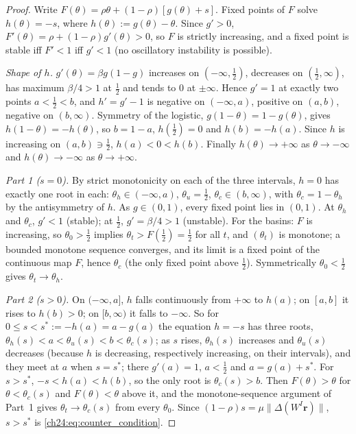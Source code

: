 \documentclass[../structural_economics_book.tex]{subfiles}
\begin{document}
\begin{proof}
Write $F(\theta) = \rho\theta + (1-\rho)[g(\theta) + s]$. Fixed points of $F$ solve $h(\theta) = -s$, where $h(\theta) := g(\theta) - \theta$. Since $g' > 0$, $F'(\theta) = \rho + (1-\rho)g'(\theta) > 0$, so $F$ is strictly increasing, and a fixed point is stable iff $F' < 1$ iff $g' < 1$ (no oscillatory instability is possible).

\emph{Shape of $h$.} $g'(\theta) = \beta g(1-g)$ increases on $(-\infty,\tfrac12)$, decreases on $(\tfrac12,\infty)$, has maximum $\beta/4 > 1$ at $\tfrac12$ and tends to $0$ at $\pm\infty$. Hence $g' = 1$ at exactly two points $a < \tfrac12 < b$, and $h' = g' - 1$ is negative on $(-\infty,a)$, positive on $(a,b)$, negative on $(b,\infty)$. Symmetry of the logistic, $g(1-\theta) = 1 - g(\theta)$, gives $h(1-\theta) = -h(\theta)$, so $b = 1-a$, $h(\tfrac12) = 0$ and $h(b) = -h(a)$. Since $h$ is increasing on $(a,b) \ni \tfrac12$, $h(a) < 0 < h(b)$. Finally $h(\theta) \to +\infty$ as $\theta \to -\infty$ and $h(\theta) \to -\infty$ as $\theta \to +\infty$.

\emph{Part 1 ($s=0$).} By strict monotonicity on each of the three intervals, $h = 0$ has exactly one root in each: $\theta_h \in (-\infty, a)$, $\theta_u = \tfrac12$, $\theta_c \in (b, \infty)$, with $\theta_c = 1 - \theta_h$ by the antisymmetry of $h$. As $g \in (0,1)$, every fixed point lies in $(0,1)$. At $\theta_h$ and $\theta_c$, $g' < 1$ (stable); at $\tfrac12$, $g' = \beta/4 > 1$ (unstable). For the basins: $F$ is increasing, so $\theta_0 > \tfrac12$ implies $\theta_t > F(\tfrac12) = \tfrac12$ for all $t$, and $(\theta_t)$ is monotone; a bounded monotone sequence converges, and its limit is a fixed point of the continuous map $F$, hence $\theta_c$ (the only fixed point above $\tfrac12$). Symmetrically $\theta_0 < \tfrac12$ gives $\theta_t \to \theta_h$.

\emph{Part 2 ($s > 0$).} On $(-\infty,a]$, $h$ falls continuously from $+\infty$ to $h(a)$; on $[a,b]$ it rises to $h(b) > 0$; on $[b,\infty)$ it falls to $-\infty$. So for $0 \le s < s^* := -h(a) = a - g(a)$ the equation $h = -s$ has three roots, $\theta_h(s) < a < \theta_u(s) < b < \theta_c(s)$; as $s$ rises, $\theta_h(s)$ increases and $\theta_u(s)$ decreases (because $h$ is decreasing, respectively increasing, on their intervals), and they meet at $a$ when $s = s^*$; there $g'(a) = 1$, $a < \tfrac12$ and $a = g(a) + s^*$. For $s > s^*$, $-s < h(a) < h(b)$, so the only root is $\theta_c(s) > b$. Then $F(\theta) > \theta$ for $\theta < \theta_c(s)$ and $F(\theta) < \theta$ above it, and the monotone-sequence argument of Part~1 gives $\theta_t \to \theta_c(s)$ from every $\theta_0$. Since $(1-\rho)s = \mu\|\Delta(W^I\mathbf{r})\|$, $s > s^*$ is \eqref{ch24:eq:counter_condition}.
\end{proof}
\end{document}
